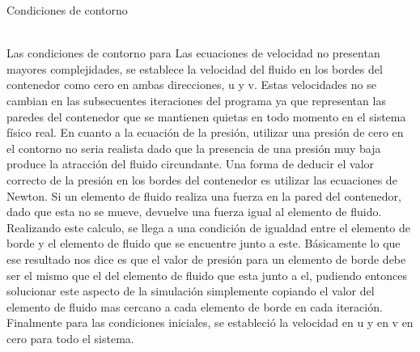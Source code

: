 \begin{section}{Condiciones de contorno}
\begin{figure}[h]
\end{figure}

~\\
Las condiciones de contorno para Las ecuaciones de velocidad no presentan mayores complejidades, se establece la velocidad del fluido en los bordes del contenedor como cero en ambas direcciones, u y v. Estas velocidades no se cambian en las subsecuentes iteraciones del programa ya que representan las paredes del contenedor que se mantienen quietas en todo momento en el sistema físico real.
En cuanto a la ecuación de la presión, utilizar una presión de cero en el contorno no seria realista dado que la presencia de una  presión muy baja produce la atracción del fluido circundante. Una forma de deducir el valor correcto de la presión en los bordes del contenedor es utilizar las ecuaciones de Newton. Si un elemento de fluido realiza una fuerza en la pared del contenedor, dado que esta no se mueve, devuelve una fuerza igual al elemento de fluido. Realizando este calculo, se llega a una condición de igualdad entre el elemento de borde y el elemento de fluido que se encuentre junto a este. Básicamente lo que ese resultado nos dice es que el valor de presión para un elemento de borde debe ser el mismo que el del elemento de fluido que esta junto a el, pudiendo entonces solucionar este aspecto de la simulación simplemente copiando el valor del elemento de fluido mas cercano a cada elemento de borde en cada iteración.\\
Finalmente para las condiciones iniciales, se estableció la velocidad en u y en v en cero para todo el sistema.

\end{section}
